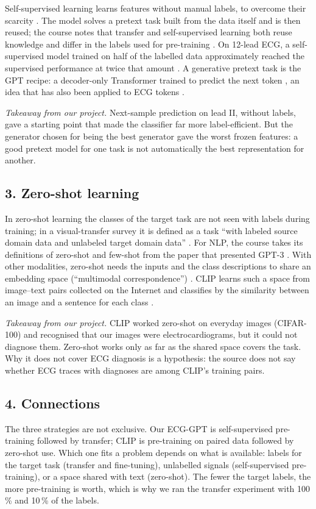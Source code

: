 Self-supervised learning learns features without manual labels, to overcome their scarcity
\cite[p.~1]{soltanieh2022analysis}. The model solves a pretext task built from the data itself and is then reused;
the course notes that transfer and self-supervised learning both reuse knowledge and differ in the labels
used for pre-training \cite{course_summary_0910}. On 12-lead ECG, a self-supervised model trained on half
of the labelled data approximately reached the supervised performance at twice that amount
\cite[pp.~7--8]{mehari2022self}. A generative pretext task is the GPT recipe: a decoder-only Transformer trained to
predict the next token \cite[p.~3]{radford2018improving}, an idea that has also been applied to ECG tokens
\cite[p.~1]{yang2025heartllm}.

\emph{Takeaway from our project.} Next-sample prediction on lead II, without labels, gave a starting point
that made the classifier far more label-efficient. But the generator chosen for being the best generator
gave the worst frozen features: a good pretext model for one task is not automatically the best
representation for another.

\subsection*{3. Zero-shot learning}

In zero-shot learning the classes of the target task are not seen with labels during training; in a
visual-transfer survey it is defined as a task ``with labeled source domain data and unlabeled target
domain data'' \cite[p.~4]{monka2022survey}. For NLP, the course takes its definitions of zero-shot and few-shot from the paper that
presented GPT-3 \cite{course_summary_0910}. With other modalities,
zero-shot needs the inputs and the class descriptions to share an embedding space (``multimodal
correspondence'') \cite{course_summary_0910}. CLIP learns such a space from image--text pairs collected on
the Internet and classifies by the similarity between an image and a sentence for each class
\cite[pp.~3, 6]{radford2021learning}.

\emph{Takeaway from our project.} CLIP worked zero-shot on everyday images (CIFAR-100) and recognised that
our images were electrocardiograms, but it could not diagnose them. Zero-shot works only as far as the
shared space covers the task. Why it does not cover ECG diagnosis is a hypothesis: the source does not say
whether ECG traces with diagnoses are among CLIP's training pairs.

\subsection*{4. Connections}

The three strategies are not exclusive. Our ECG-GPT is self-supervised pre-training followed by transfer;
CLIP is pre-training on paired data followed by zero-shot use. Which one fits a problem depends on what is
available: labels for the target task (transfer and fine-tuning), unlabelled signals (self-supervised
pre-training), or a space shared with text (zero-shot). The fewer the target labels, the more
pre-training is worth, which is why we ran the transfer experiment with 100\,\% and 10\,\% of the labels.

